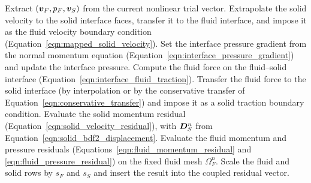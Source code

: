\begin{algorithm}[htbp]
\caption{Coupled residual evaluation $\bb{R}(\bb{\mathcal{U}})$}
\label{alg:coupled_residual}
\begin{algorithmic}[1]
\State Extract $(\boldsymbol{v}_F,p_F,\boldsymbol{v}_S)$ from the current nonlinear trial vector.
\State Extrapolate the solid velocity to the solid interface faces, transfer it to the fluid interface, and impose it as the fluid velocity boundary condition (Equation~\eqref{eqn:mapped_solid_velocity}).
\State Set the interface pressure gradient from the normal momentum equation (Equation~\eqref{eqn:interface_pressure_gradient}) and update the interface pressure.
\State Compute the fluid force on the fluid--solid interface (Equation~\eqref{eqn:interface_fluid_traction}).
\State Transfer the fluid force to the solid interface (by interpolation or by the conservative transfer of Equation~\eqref{eqn:conservative_transfer}) and impose it as a solid traction boundary condition.
\State Evaluate the solid momentum residual (Equation~\eqref{eqn:solid_velocity_residual}), with $\boldsymbol{D}_S^n$ from Equation~\eqref{eqn:solid_bdf2_displacement}.
\State Evaluate the fluid momentum and pressure residuals (Equations~\eqref{eqn:fluid_momentum_residual} and \eqref{eqn:fluid_pressure_residual}) on the fixed fluid mesh $\Omega_F^n$.
\State Scale the fluid and solid rows by $s_F$ and $s_S$ and insert the result into the coupled residual vector.
\end{algorithmic}
\end{algorithm}


